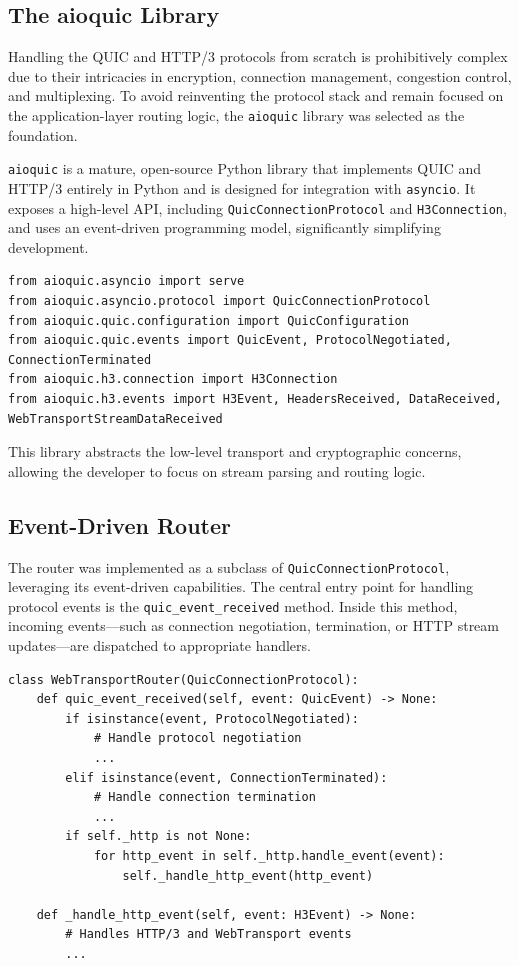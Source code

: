 \subsection{The aioquic Library}

Handling the QUIC and HTTP/3 protocols from scratch is prohibitively complex due to their intricacies in encryption, connection management, congestion control, and multiplexing. To avoid reinventing the protocol stack and remain focused on the application-layer routing logic, the \texttt{aioquic} library was selected as the foundation.

\texttt{aioquic} is a mature, open-source Python library that implements QUIC and HTTP/3 entirely in Python and is designed for integration with \texttt{asyncio}. It exposes a high-level API, including \texttt{QuicConnectionProtocol} and \texttt{H3Connection}, and uses an event-driven programming model, significantly simplifying development.

\begin{lstlisting}[breaklines=true,basicstyle=\small\ttfamily,frame=single]
from aioquic.asyncio import serve
from aioquic.asyncio.protocol import QuicConnectionProtocol
from aioquic.quic.configuration import QuicConfiguration
from aioquic.quic.events import QuicEvent, ProtocolNegotiated, ConnectionTerminated
from aioquic.h3.connection import H3Connection
from aioquic.h3.events import H3Event, HeadersReceived, DataReceived, WebTransportStreamDataReceived
\end{lstlisting}

This library abstracts the low-level transport and cryptographic concerns, allowing the developer to focus on stream parsing and routing logic.

\subsection{Event-Driven Router}

The router was implemented as a subclass of \texttt{QuicConnectionProtocol}, leveraging its event-driven capabilities. The central entry point for handling protocol events is the \texttt{quic\_event\_received} method. Inside this method, incoming events—such as connection negotiation, termination, or HTTP stream updates—are dispatched to appropriate handlers.

\begin{lstlisting}[breaklines=true,basicstyle=\small\ttfamily,frame=single]
class WebTransportRouter(QuicConnectionProtocol):
    def quic_event_received(self, event: QuicEvent) -> None:
        if isinstance(event, ProtocolNegotiated):
            # Handle protocol negotiation
            ...
        elif isinstance(event, ConnectionTerminated):
            # Handle connection termination
            ...
        if self._http is not None:
            for http_event in self._http.handle_event(event):
                self._handle_http_event(http_event)

    def _handle_http_event(self, event: H3Event) -> None:
        # Handles HTTP/3 and WebTransport events
        ...
\end{lstlisting}

